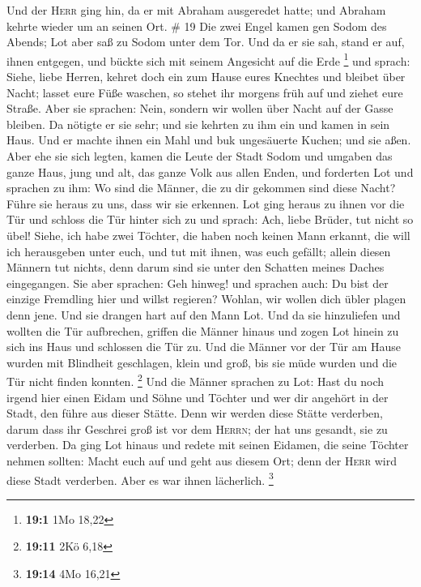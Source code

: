  Und der \textsc{Herr} ging hin, da er mit Abraham
ausgeredet hatte; und Abraham kehrte wieder um an seinen Ort. \# 19
 Die zwei Engel kamen gen Sodom des Abends; Lot aber saß
zu Sodom unter dem Tor. Und da er sie sah, stand er auf, ihnen entgegen,
und bückte sich mit seinem Angesicht auf die Erde \footnote{\textbf{19:1}
  1Mo 18,22}  und sprach: Siehe, liebe Herren, kehret doch
ein zum Hause eures Knechtes und bleibet über Nacht; lasset eure Füße
waschen, so stehet ihr morgens früh auf und ziehet eure Straße. Aber sie
sprachen: Nein, sondern wir wollen über Nacht auf der Gasse bleiben.
 Da nötigte er sie sehr; und sie kehrten zu ihm ein und
kamen in sein Haus. Und er machte ihnen ein Mahl und buk ungesäuerte
Kuchen; und sie aßen.  Aber ehe sie sich legten, kamen die
Leute der Stadt Sodom und umgaben das ganze Haus, jung und alt, das
ganze Volk aus allen Enden,  und forderten Lot und
sprachen zu ihm: Wo sind die Männer, die zu dir gekommen sind diese
Nacht? Führe sie heraus zu uns, dass wir sie erkennen. 
Lot ging heraus zu ihnen vor die Tür und schloss die Tür hinter sich zu
 und sprach: Ach, liebe Brüder, tut nicht so übel!
 Siehe, ich habe zwei Töchter, die haben noch keinen Mann
erkannt, die will ich herausgeben unter euch, und tut mit ihnen, was
euch gefällt; allein diesen Männern tut nichts, denn darum sind sie
unter den Schatten meines Daches eingegangen.  Sie aber
sprachen: Geh hinweg! und sprachen auch: Du bist der einzige Fremdling
hier und willst regieren? Wohlan, wir wollen dich übler plagen denn
jene. Und sie drangen hart auf den Mann Lot. Und da sie hinzuliefen und
wollten die Tür aufbrechen,  griffen die Männer hinaus
und zogen Lot hinein zu sich ins Haus und schlossen die Tür zu.
 Und die Männer vor der Tür am Hause wurden mit Blindheit
geschlagen, klein und groß, bis sie müde wurden und die Tür nicht finden
konnten. \footnote{\textbf{19:11} 2Kö 6,18}  Und die
Männer sprachen zu Lot: Hast du noch irgend hier einen Eidam und Söhne
und Töchter und wer dir angehört in der Stadt, den führe aus dieser
Stätte.  Denn wir werden diese Stätte verderben, darum
dass ihr Geschrei groß ist vor dem \textsc{Herrn}; der hat uns gesandt,
sie zu verderben.  Da ging Lot hinaus und redete mit
seinen Eidamen, die seine Töchter nehmen sollten: Macht euch auf und
geht aus diesem Ort; denn der \textsc{Herr} wird diese Stadt verderben.
Aber es war ihnen lächerlich. \footnote{\textbf{19:14} 4Mo 16,21}

